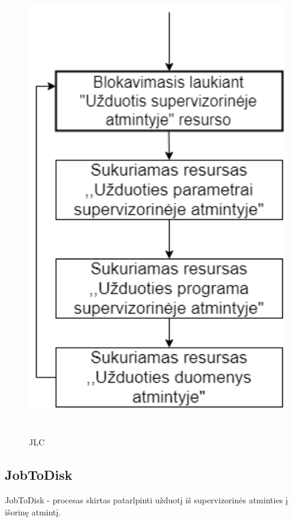 \documentclass[oneside]{VUMIFPSkursinis}
\begin{document}
\begin{figure}[H]
		\centering	
	\includegraphics[width=18cm,height=20cm,keepaspectratio]{JLC.png}
	\caption{JLC}
	\label{fig:JLC}
\end{figure} 

\subsection{JobToDisk} JobToDisk - procesas skirtas patarlpinti užduotį iš supervizorinės atminties į išorinę atmintį.
\end{document}
